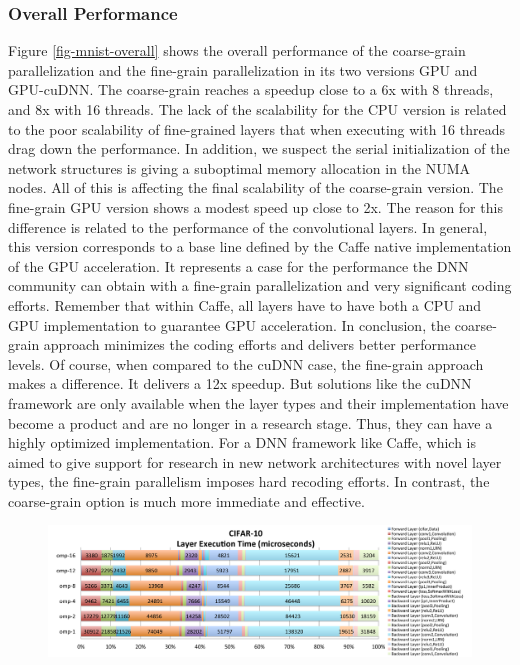 
\subsubsection{Overall Performance}
Figure \ref{fig-mnist-overall} shows the overall performance of
the coarse-grain parallelization and the fine-grain parallelization in 
its two versions GPU and GPU-cuDNN. The coarse-grain reaches a speedup 
close to a 6x with 8 threads, and 8x with 16 threads. The lack of 
the scalability for the CPU version is related to the poor scalability 
of fine-grained layers that when executing with 16 threads drag down 
the performance. In addition, we suspect the serial initialization of 
the network structures is giving a suboptimal memory allocation in 
the NUMA nodes. All of this is affecting the final scalability of 
the coarse-grain version. The fine-grain GPU version shows a 
modest speed up close to 2x. The reason for this difference is related 
to the performance of the convolutional layers. In general, this version 
corresponds to a base line defined by the Caffe native implementation 
of the GPU acceleration. It represents a case for the performance the DNN 
community can obtain with a fine-grain parallelization and very significant 
coding efforts. Remember that within Caffe, all layers have to have 
both a CPU and GPU implementation to guarantee GPU acceleration. 
In conclusion, the coarse-grain approach minimizes the coding efforts 
and delivers better performance levels. Of course, when compared to 
the cuDNN case, the fine-grain approach makes a difference. 
It delivers a 12x speedup. But solutions like the cuDNN framework are 
only available when the layer types and their implementation have become 
a product and are no longer in a research stage. Thus, they can have a 
highly optimized implementation. For a DNN framework like Caffe, 
which is aimed to give support for research in new network architectures 
with novel layer types, the fine-grain parallelism imposes hard recoding 
efforts. In contrast, the coarse-grain option is much more immediate and 
effective.

\begin{figure}[]
\includegraphics[width=\textwidth]{figures/cifar-abs-rel-time.pdf}
\caption{}
\end{figure}

